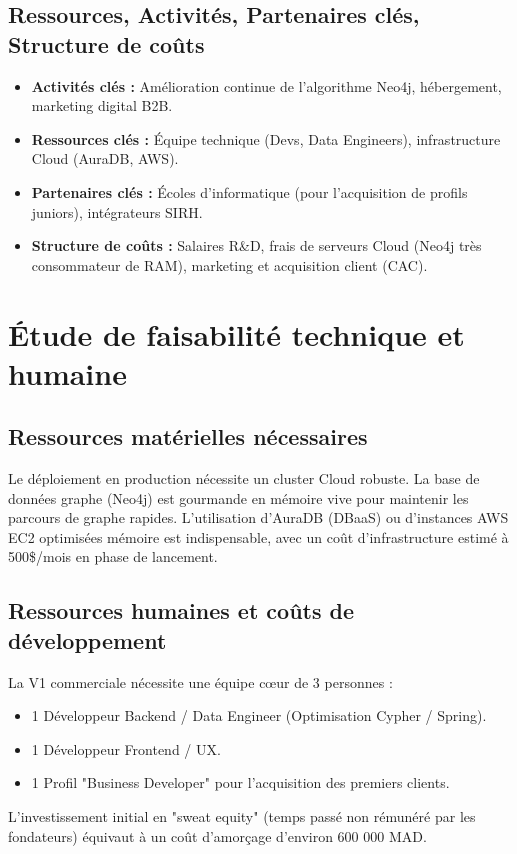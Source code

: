 \documentclass[12pt,a4paper]{report}
\begin{document}
\begin{itemize}
\subsection{Ressources, Activités, Partenaires clés, Structure de coûts}
\begin{itemize}
    \item \textbf{Activités clés :} Amélioration continue de l'algorithme Neo4j, hébergement, marketing digital B2B.
    \item \textbf{Ressources clés :} Équipe technique (Devs, Data Engineers), infrastructure Cloud (AuraDB, AWS).
    \item \textbf{Partenaires clés :} Écoles d'informatique (pour l'acquisition de profils juniors), intégrateurs SIRH.
    \item \textbf{Structure de coûts :} Salaires R\&D, frais de serveurs Cloud (Neo4j très consommateur de RAM), marketing et acquisition client (CAC).
\end{itemize}

\section{Étude de faisabilité technique et humaine}

\subsection{Ressources matérielles nécessaires}
Le déploiement en production nécessite un cluster Cloud robuste. La base de données graphe (Neo4j) est gourmande en mémoire vive pour maintenir les parcours de graphe rapides. L'utilisation d'AuraDB (DBaaS) ou d'instances AWS EC2 optimisées mémoire est indispensable, avec un coût d'infrastructure estimé à 500\$/mois en phase de lancement.

\subsection{Ressources humaines et coûts de développement}
La V1 commerciale nécessite une équipe cœur de 3 personnes :
\begin{itemize}
    \item 1 Développeur Backend / Data Engineer (Optimisation Cypher / Spring).
    \item 1 Développeur Frontend / UX.
    \item 1 Profil "Business Developer" pour l'acquisition des premiers clients.
\end{itemize}
L'investissement initial en "sweat equity" (temps passé non rémunéré par les fondateurs) équivaut à un coût d'amorçage d'environ 600 000 MAD.


\end{itemize}
\end{document}
